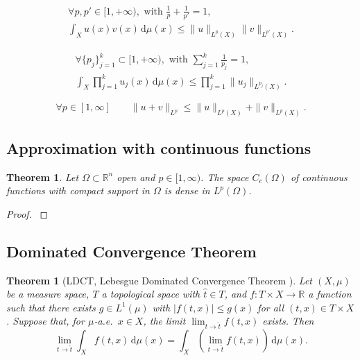 \documentclass[a4paper,9pt]{amsart}
\newcommand{\R}{\mathbb{R}}	%
\newcommand{\did}{\,\mathrm{d}}	%
\newcommand{\THEN}{\Rightarrow}	%
\theoremstyle{plain}
\newtheorem{theorem}[proposition]{Theorem}
\theoremstyle{definition}
\theoremstyle{remark}
\begin{document}
\begin{equation}\label{Hölder}
\begin{array}{c}
	\forall p,p'\in[1,+\infty),
	\text{ with }\frac{1}{p} + \frac{1}{p'} = 1, \\
	\int_X u(x)v(x) \did\mu(x) \le \|u\|_{L^p(X)} \|v\|_{L^{p'}(X)} .
\end{array}
	\tag{Hölder}
\end{equation}

\begin{equation}\label{General Hölder}
\begin{array}{c}
	\forall \{p_j\}_{j=1}^k\subset[1,+\infty),
	\text{ with }\sum_{j=1}^k \frac1{p_j} = 1, \\
	\int_X \prod_{j=1}^k u_j(x) \did\mu(x) \le \prod_{j=1}^k \|u_j\|_{L^{p_j}(X)} .
\end{array}
	\tag{General Hölder}
\end{equation}

\begin{equation}\label{Minkowski}
	\forall p\in[1,\infty]\qquad
	\|u+v\|_{L^p} \le \|u\|_{L^p(X)} + \|v\|_{L^p(X)} .
	\tag{Minkowski}
\end{equation}




\subsection{Approximation with continuous functions}
\begin{theorem}\label{thm680f2023}
	Let $\Omega\subset\R^n$ open and $p\in[1,\infty)$.
	The space $C_c(\Omega)$ of continuous functions with compact support in $\Omega$ is dense in $L^p(\Omega)$.
\end{theorem}
\begin{proof}
	\cite[Proposition (7.9)]{MR767633}
\end{proof}


\subsection{Dominated Convergence Theorem}
\begin{theorem}[LDCT, Lebesgue Dominated Convergence Theorem {\cite[Theorem 2.24]{MR767633}}]\label{thm6798ec42}
	\makeatletter\def\@currentlabel{\text{LDCT}}\makeatother
	\label{LDCT}
	Let $(X,\mu)$ be a measure space, $T$ a topological space with $\hat t\in T$, and $f:T\times X\to\R$ a function such that there exists $g\in L^1(\mu)$ with $|f(t,x)|\le g(x)$ for all $(t,x)\in T\times X$.
	Suppose that, for $\mu$-a.e.~$x\in X$, the limit $\lim_{t\to \hat t} f(t,x)$ exists.
	Then
	\[
	\lim_{t\to \hat t} \int_X f(t,x) \did \mu(x)
	= \int_X (\lim_{t\to \hat t} f(t,x)) \did \mu(x) .
	\]
\end{theorem}
\end{document}
